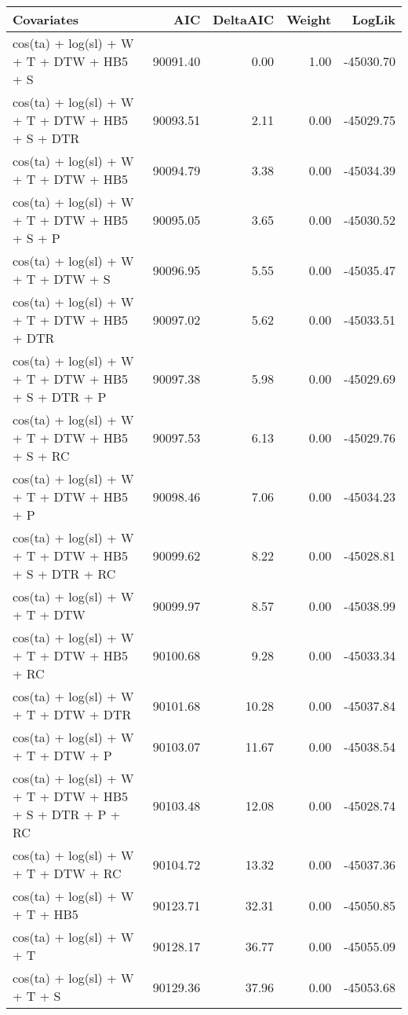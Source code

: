 \begin{tabular}{lrrrr}
  \toprule
Covariates & AIC & DeltaAIC & Weight & LogLik \\ 
  \midrule
cos(ta) + log(sl) + W + T + DTW + HB5 + S & 90091.40 & 0.00 & 1.00 & -45030.70 \\ 
  cos(ta) + log(sl) + W + T + DTW + HB5 + S + DTR & 90093.51 & 2.11 & 0.00 & -45029.75 \\ 
  cos(ta) + log(sl) + W + T + DTW + HB5 & 90094.79 & 3.38 & 0.00 & -45034.39 \\ 
  cos(ta) + log(sl) + W + T + DTW + HB5 + S + P & 90095.05 & 3.65 & 0.00 & -45030.52 \\ 
  cos(ta) + log(sl) + W + T + DTW + S & 90096.95 & 5.55 & 0.00 & -45035.47 \\ 
  cos(ta) + log(sl) + W + T + DTW + HB5 + DTR & 90097.02 & 5.62 & 0.00 & -45033.51 \\ 
  cos(ta) + log(sl) + W + T + DTW + HB5 + S + DTR + P & 90097.38 & 5.98 & 0.00 & -45029.69 \\ 
  cos(ta) + log(sl) + W + T + DTW + HB5 + S + RC & 90097.53 & 6.13 & 0.00 & -45029.76 \\ 
  cos(ta) + log(sl) + W + T + DTW + HB5 + P & 90098.46 & 7.06 & 0.00 & -45034.23 \\ 
  cos(ta) + log(sl) + W + T + DTW + HB5 + S + DTR + RC & 90099.62 & 8.22 & 0.00 & -45028.81 \\ 
  cos(ta) + log(sl) + W + T + DTW & 90099.97 & 8.57 & 0.00 & -45038.99 \\ 
  cos(ta) + log(sl) + W + T + DTW + HB5 + RC & 90100.68 & 9.28 & 0.00 & -45033.34 \\ 
  cos(ta) + log(sl) + W + T + DTW + DTR & 90101.68 & 10.28 & 0.00 & -45037.84 \\ 
  cos(ta) + log(sl) + W + T + DTW + P & 90103.07 & 11.67 & 0.00 & -45038.54 \\ 
  cos(ta) + log(sl) + W + T + DTW + HB5 + S + DTR + P + RC & 90103.48 & 12.08 & 0.00 & -45028.74 \\ 
  cos(ta) + log(sl) + W + T + DTW + RC & 90104.72 & 13.32 & 0.00 & -45037.36 \\ 
  cos(ta) + log(sl) + W + T + HB5 & 90123.71 & 32.31 & 0.00 & -45050.85 \\ 
  cos(ta) + log(sl) + W + T & 90128.17 & 36.77 & 0.00 & -45055.09 \\ 
  cos(ta) + log(sl) + W + T + S & 90129.36 & 37.96 & 0.00 & -45053.68 \\ 

\end{tabular}

